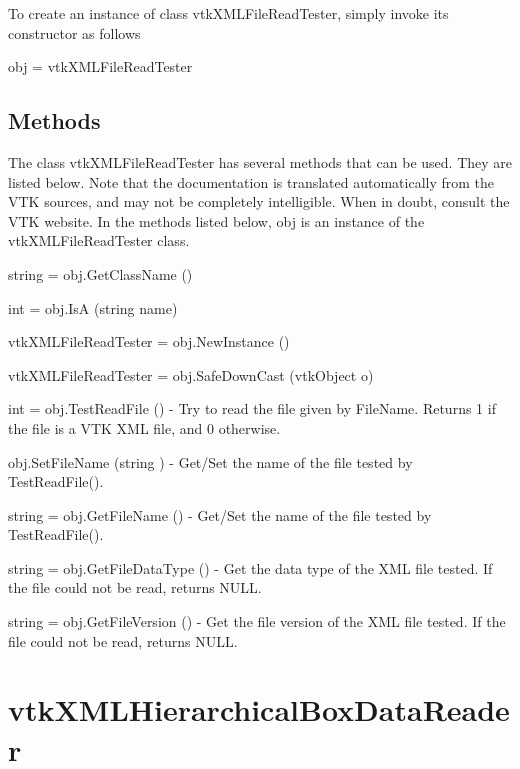 To create an instance of class vtk\-X\-M\-L\-File\-Read\-Tester, simply invoke its constructor as follows \begin{DoxyVerb}  obj = vtkXMLFileReadTester
\end{DoxyVerb}
 \hypertarget{vtkwidgets_vtkxyplotwidget_Methods}{}\subsection{Methods}\label{vtkwidgets_vtkxyplotwidget_Methods}
The class vtk\-X\-M\-L\-File\-Read\-Tester has several methods that can be used. They are listed below. Note that the documentation is translated automatically from the V\-T\-K sources, and may not be completely intelligible. When in doubt, consult the V\-T\-K website. In the methods listed below, {\ttfamily obj} is an instance of the vtk\-X\-M\-L\-File\-Read\-Tester class. 
\begin{DoxyItemize}
\item {\ttfamily string = obj.\-Get\-Class\-Name ()}  
\item {\ttfamily int = obj.\-Is\-A (string name)}  
\item {\ttfamily vtk\-X\-M\-L\-File\-Read\-Tester = obj.\-New\-Instance ()}  
\item {\ttfamily vtk\-X\-M\-L\-File\-Read\-Tester = obj.\-Safe\-Down\-Cast (vtk\-Object o)}  
\item {\ttfamily int = obj.\-Test\-Read\-File ()} -\/ Try to read the file given by File\-Name. Returns 1 if the file is a V\-T\-K X\-M\-L file, and 0 otherwise.  
\item {\ttfamily obj.\-Set\-File\-Name (string )} -\/ Get/\-Set the name of the file tested by Test\-Read\-File().  
\item {\ttfamily string = obj.\-Get\-File\-Name ()} -\/ Get/\-Set the name of the file tested by Test\-Read\-File().  
\item {\ttfamily string = obj.\-Get\-File\-Data\-Type ()} -\/ Get the data type of the X\-M\-L file tested. If the file could not be read, returns N\-U\-L\-L.  
\item {\ttfamily string = obj.\-Get\-File\-Version ()} -\/ Get the file version of the X\-M\-L file tested. If the file could not be read, returns N\-U\-L\-L.  
\end{DoxyItemize}\hypertarget{vtkio_vtkxmlhierarchicalboxdatareader}{}\section{vtk\-X\-M\-L\-Hierarchical\-Box\-Data\-Reader}\label{vtkio_vtkxmlhierarchicalboxdatareader}
